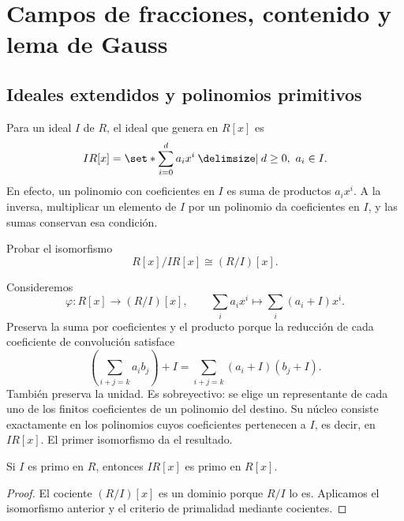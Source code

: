 \section{Campos de fracciones, contenido y lema de Gauss}\label{sec:anillos-fracciones}

\subsection{Ideales extendidos y polinomios primitivos}\label{tema:17-3-1}\label{tema:17-3-2}
Para un ideal $I$ de $R$, el ideal que genera en $R[x]$ es
\[
IR[x]=\set*{\sum_{i=0}^d a_ix^i\given d\geq0,\ a_i\in I}.
\]
En efecto, un polinomio con coeficientes en $I$ es suma de productos $a_ix^i$. A la inversa, multiplicar un elemento de $I$ por un polinomio da coeficientes en $I$, y las sumas conservan esa condición.

\begin{ejer}\label{ejer:C17-coeficientes}
Probar el isomorfismo
\[
R[x]/IR[x]\cong(R/I)[x].
\]

\end{ejer}
\begin{sol}
Consideremos
\[
\varphi:R[x]\longrightarrow(R/I)[x],\qquad
\sum_i a_ix^i\longmapsto\sum_i(a_i+I)x^i.
\]
Preserva la suma por coeficientes y el producto porque la reducción de cada coeficiente de convolución satisface
\[
\left(\sum_{i+j=k}a_ib_j\right)+I
=\sum_{i+j=k}(a_i+I)(b_j+I).
\]
También preserva la unidad. Es sobreyectivo: se elige un representante de cada uno de los finitos coeficientes de un polinomio del destino. Su núcleo consiste exactamente en los polinomios cuyos coeficientes pertenecen a $I$, es decir, en $IR[x]$. El primer isomorfismo da el resultado.
\end{sol}
\begin{coro}\label{coro:C17-primo-extendido}
Si $I$ es primo en $R$, entonces $IR[x]$ es primo en $R[x]$.
\end{coro}
\begin{proof}
El cociente $(R/I)[x]$ es un dominio porque $R/I$ lo es. Aplicamos el isomorfismo anterior y el criterio de primalidad mediante cocientes.
\end{proof}

